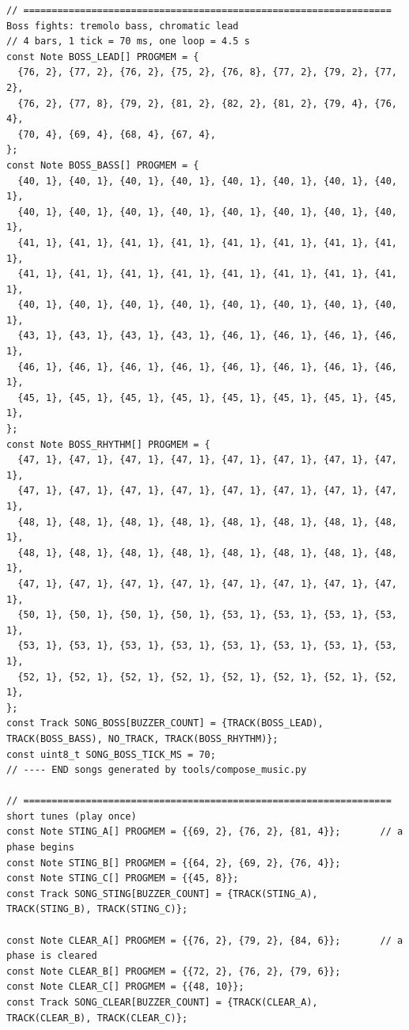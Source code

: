 \documentclass[11pt,a4paper]{article}
\begin{document}
\begin{latin}
\begin{lstlisting}[language=Arduino]
// ================================================================= Boss fights: tremolo bass, chromatic lead
// 4 bars, 1 tick = 70 ms, one loop = 4.5 s
const Note BOSS_LEAD[] PROGMEM = {
  {76, 2}, {77, 2}, {76, 2}, {75, 2}, {76, 8}, {77, 2}, {79, 2}, {77, 2},
  {76, 2}, {77, 8}, {79, 2}, {81, 2}, {82, 2}, {81, 2}, {79, 4}, {76, 4},
  {70, 4}, {69, 4}, {68, 4}, {67, 4},
};
const Note BOSS_BASS[] PROGMEM = {
  {40, 1}, {40, 1}, {40, 1}, {40, 1}, {40, 1}, {40, 1}, {40, 1}, {40, 1},
  {40, 1}, {40, 1}, {40, 1}, {40, 1}, {40, 1}, {40, 1}, {40, 1}, {40, 1},
  {41, 1}, {41, 1}, {41, 1}, {41, 1}, {41, 1}, {41, 1}, {41, 1}, {41, 1},
  {41, 1}, {41, 1}, {41, 1}, {41, 1}, {41, 1}, {41, 1}, {41, 1}, {41, 1},
  {40, 1}, {40, 1}, {40, 1}, {40, 1}, {40, 1}, {40, 1}, {40, 1}, {40, 1},
  {43, 1}, {43, 1}, {43, 1}, {43, 1}, {46, 1}, {46, 1}, {46, 1}, {46, 1},
  {46, 1}, {46, 1}, {46, 1}, {46, 1}, {46, 1}, {46, 1}, {46, 1}, {46, 1},
  {45, 1}, {45, 1}, {45, 1}, {45, 1}, {45, 1}, {45, 1}, {45, 1}, {45, 1},
};
const Note BOSS_RHYTHM[] PROGMEM = {
  {47, 1}, {47, 1}, {47, 1}, {47, 1}, {47, 1}, {47, 1}, {47, 1}, {47, 1},
  {47, 1}, {47, 1}, {47, 1}, {47, 1}, {47, 1}, {47, 1}, {47, 1}, {47, 1},
  {48, 1}, {48, 1}, {48, 1}, {48, 1}, {48, 1}, {48, 1}, {48, 1}, {48, 1},
  {48, 1}, {48, 1}, {48, 1}, {48, 1}, {48, 1}, {48, 1}, {48, 1}, {48, 1},
  {47, 1}, {47, 1}, {47, 1}, {47, 1}, {47, 1}, {47, 1}, {47, 1}, {47, 1},
  {50, 1}, {50, 1}, {50, 1}, {50, 1}, {53, 1}, {53, 1}, {53, 1}, {53, 1},
  {53, 1}, {53, 1}, {53, 1}, {53, 1}, {53, 1}, {53, 1}, {53, 1}, {53, 1},
  {52, 1}, {52, 1}, {52, 1}, {52, 1}, {52, 1}, {52, 1}, {52, 1}, {52, 1},
};
const Track SONG_BOSS[BUZZER_COUNT] = {TRACK(BOSS_LEAD), TRACK(BOSS_BASS), NO_TRACK, TRACK(BOSS_RHYTHM)};
const uint8_t SONG_BOSS_TICK_MS = 70;
// ---- END songs generated by tools/compose_music.py

// ================================================================= short tunes (play once)
const Note STING_A[] PROGMEM = {{69, 2}, {76, 2}, {81, 4}};       // a phase begins
const Note STING_B[] PROGMEM = {{64, 2}, {69, 2}, {76, 4}};
const Note STING_C[] PROGMEM = {{45, 8}};
const Track SONG_STING[BUZZER_COUNT] = {TRACK(STING_A), TRACK(STING_B), TRACK(STING_C)};

const Note CLEAR_A[] PROGMEM = {{76, 2}, {79, 2}, {84, 6}};       // a phase is cleared
const Note CLEAR_B[] PROGMEM = {{72, 2}, {76, 2}, {79, 6}};
const Note CLEAR_C[] PROGMEM = {{48, 10}};
const Track SONG_CLEAR[BUZZER_COUNT] = {TRACK(CLEAR_A), TRACK(CLEAR_B), TRACK(CLEAR_C)};


\end{lstlisting}
\end{latin}
\end{document}
